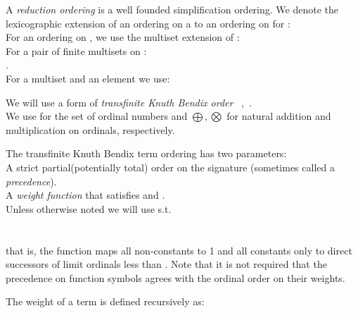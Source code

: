 A \emph{reduction ordering} is a well founded simplification ordering.
We denote the lexicographic extension of an ordering on a  to an ordering on  for :\\
For an ordering \m{\succ} on , we use the multiset extension of \m{\succ}:\\
For a pair of finite multisets on  :\\
.\\
For a multiset  and an element  we use:\\


We will use a form of \emph{transfinite Knuth Bendix order} ~\cite{WinklerZanklMiddeldorp12},~\cite{KovacsMoserVoronkov11}.\\
We use \ords for the set of ordinal numbers and $\bigoplus,\bigotimes$ for natural addition and multiplication on ordinals, respectively.

The transfinite Knuth Bendix term ordering  has two parameters:\\
A strict partial(potentially total) order \m{\succ} on the signature  (sometimes called a \emph{precedence}).\\
A \emph{weight function}  that satisfies  and  .\\
Unless otherwise noted we will use  s.t. \\
\\
\\
that is, the function maps all non-constants to 1 and all constants only to direct successors of limit ordinals less than \m{\omega^\omega}. 
Note that it is not required that the precedence on function symbols agrees with the ordinal order on their weights.

The weight of a term is defined recursively as:\\


